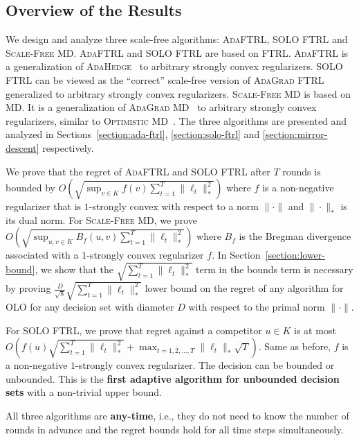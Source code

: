 \subsection{Overview of the Results}

We design and analyze three scale-free algorithms: \textsc{AdaFTRL},
\textsc{SOLO FTRL} and \textsc{Scale-Free MD}.  \textsc{AdaFTRL} and
\textsc{SOLO FTRL} are based on \textsc{FTRL}.  \textsc{AdaFTRL} is a
generalization of
\textsc{AdaHedge}~\cite{de-Rooij-van-Erven-Grunwald-Koolen-2014} to arbitrary
strongly convex regularizers.  \textsc{SOLO FTRL} can be viewed as the
``correct'' scale-free version of \textsc{AdaGrad
FTRL}~\cite{Duchi-Hazan-Singer-2011} generalized to arbitrary strongly convex
regularizers.  \textsc{Scale-Free MD} is based on \textsc{MD}. It is a
generalization of \textsc{AdaGrad MD}~\cite{Duchi-Hazan-Singer-2011} to
arbitrary strongly convex regularizers, similar to \textsc{Optimistic
MD}~\cite{Rakhlin-Sridharan-2013}.  The three algorithms are presented and
analyzed in Sections~\ref{section:ada-ftrl}, \ref{section:solo-ftrl} and
\ref{section:mirror-descent} respectively.

We prove that the regret of \textsc{AdaFTRL} and \textsc{SOLO FTRL} after $T$
rounds is bounded by $O \left(\sqrt{\sup_{v \in K} f(v)
\sum_{t=1}^T\|\ell_t\|_*^2} \right)$ where $f$ is a non-negative regularizer that is
$1$-strongly convex with respect to a norm $\|\cdot\|$ and $\|\cdot\|_*$ is its
dual norm. For \textsc{Scale-Free MD}, we prove $O \left(\sqrt{\sup_{u,v \in K}
B_f(u,v) \sum_{t=1}^T\|\ell_t\|_*^2} \right)$ where $B_f$ is the Bregman
divergence associated with a $1$-strongly convex regularizer $f$. In
Section~\ref{section:lower-bound}, we show that the $\sqrt{\sum_{t=1}^T
\|\ell_t\|_*^2}$ term in the bounds term is necessary by proving
$\frac{D}{\sqrt{8}} \sqrt{\sum_{t=1}^T\|\ell_t\|_*^2}$ lower bound on the
regret of any algorithm for OLO for any decision set with diameter $D$ with
respect to the primal norm $\|\cdot\|$.

For \textsc{SOLO FTRL}, we prove that regret against a competitor $u \in K$ is
at most $O \left(f(u) \sqrt{\sum_{t=1}^T \|\ell_t\|_*^2} + \max_{t=1,2,\dots,T}
\|\ell_t\|_* \sqrt{T} \right)$.  Same as before, $f$ is a non-negative
$1$-strongly convex regularizer. The decision can be bounded or unbounded. This
is the \textbf{first adaptive algorithm for unbounded decision sets} with a
non-trivial upper bound.

All three algorithms are \textbf{any-time}, i.e., they do not need to know the
number of rounds in advance and the regret bounds hold for all time steps
simultaneously.

